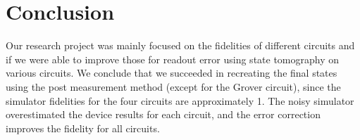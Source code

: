 \section{Conclusion}

Our research project was mainly focused on the fidelities of different circuits and if we were able to improve those for readout error using state tomography on various circuits. We conclude that we succeeded in recreating the final states using the post measurement method (except for the Grover circuit), since the simulator fidelities for the four circuits are approximately 1. The noisy simulator overestimated the device results for each circuit, and the error correction improves the fidelity for all circuits.  
